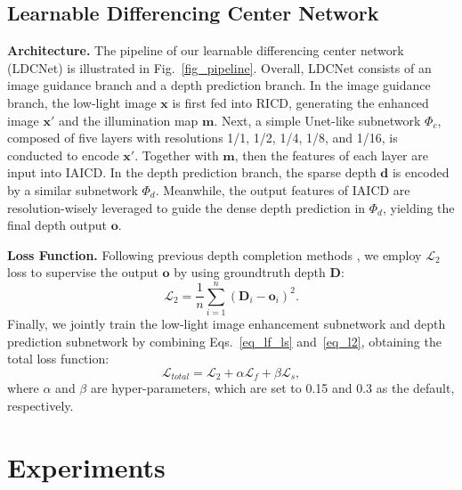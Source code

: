 \documentclass[lettersize,journal]{IEEEtran}
\begin{document}
\subsection{Learnable Differencing Center Network}\label{sec_LDCNet}
\textbf{Architecture.} The pipeline of our learnable differencing center network (LDCNet) is illustrated in Fig.~\ref{fig_pipeline}. Overall, LDCNet consists of an image guidance branch and a depth prediction branch. In the image guidance branch, the low-light image $\boldsymbol x$ is first fed into RICD, generating the enhanced image $\boldsymbol x'$ and the illumination map $\boldsymbol m$. Next, a simple Unet-like subnetwork $\Phi_c$, composed of five layers with resolutions 1/1, 1/2, 1/4, 1/8, and 1/16, is conducted to encode $\boldsymbol x'$. Together with $\boldsymbol m$, then the features of each layer are input into IAICD. In the depth prediction branch, the sparse depth $\boldsymbol d$ is encoded by a similar subnetwork $\Phi_d$. Meanwhile, the output features of IAICD are resolution-wisely leveraged to guide the dense depth prediction in $\Phi_d$, yielding the final depth output $\boldsymbol o$. 


\textbf{Loss Function.} Following previous depth completion methods \cite{tang2020learning,yan2022rignet}, we employ $\mathcal{L}_2$ loss to supervise the output $\boldsymbol o$ by using groundtruth depth $\boldsymbol D$: 
\begin{equation}\label{eq_l2}
{\mathcal{L}_{2}}=\frac{1}{n}\sum_{i=1}^{n}{{\left( \boldsymbol D_i-\boldsymbol o_i \right)}^{2}}.
\end{equation}
Finally, we jointly train the low-light image enhancement subnetwork and depth prediction subnetwork by combining Eqs.~\ref{eq_lf_ls} and~\ref{eq_l2}, obtaining the total loss function: 
\begin{equation}\label{eq_final_loss}
\mathcal{L}_{total}=\mathcal{L}_2 + \alpha \mathcal{L}_f + \beta \mathcal{L}_s,
\end{equation}
where $\alpha$ and $\beta$ are hyper-parameters, which are set to 0.15 and 0.3 as the default, respectively. 




\section{Experiments}
\end{document}
